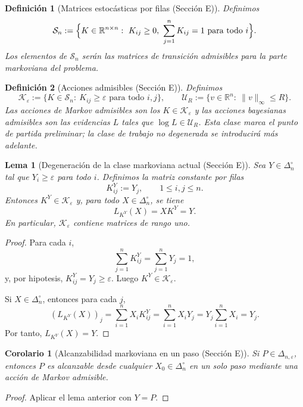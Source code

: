 ﻿\documentclass[12pt]{article}
\newcommand{\fuente}[1]{\textnormal{(#1)}}
\newtheorem{definicion}{Definición}[section]
\newtheorem{lema}{Lema}[section]
\newtheorem{corolario}{Corolario}[section]
\begin{document}
\begin{definicion}[Matrices estocásticas por filas \fuente{Sección E}]
Definimos
\[
\mathcal S_n:=\Bigl\{K\in\mathbb R^{n\times n}:\ K_{ij}\ge 0,\ \sum_{j=1}^n K_{ij}=1\text{ para todo }i\Bigr\}.
\]
Los elementos de \(\mathcal S_n\) serán las matrices de transición admisibles para la parte markoviana del problema.
\end{definicion}

\begin{definicion}[Acciones admisibles \fuente{Sección E}]
Definimos
\[
\mathcal K_\varepsilon:=\bigl\{K\in\mathcal S_n:\ K_{ij}\ge \varepsilon\text{ para todo }i,j\bigr\},
\qquad
\mathcal U_R:=\bigl\{v\in\mathbb R^n:\ \|v\|_\infty\le R\bigr\}.
\]
Las acciones de Markov admisibles son los \(K\in\mathcal K_\varepsilon\) y las acciones bayesianas admisibles son las evidencias \(L\) tales que \(\log L\in\mathcal U_R\). Esta clase marca el punto de partida preliminar; la clase de trabajo no degenerada se introducirá más adelante.
\end{definicion}

\begin{lema}[Degeneración de la clase markoviana actual \fuente{Sección E}]
Sea \(Y\in \Delta_n^\circ\) tal que \(Y_i\ge \varepsilon\) para todo \(i\). Definimos la matriz constante por filas
\[
K^Y_{ij}:=Y_j,\qquad 1\le i,j\le n.
\]
Entonces \(K^Y\in \mathcal K_\varepsilon\) y, para todo \(X\in\Delta_n^\circ\), se tiene
\[
L_{K^Y}(X)=XK^Y=Y.
\]
En particular, \(\mathcal K_\varepsilon\) contiene matrices de rango uno.
\end{lema}
\begin{proof}
Para cada \(i\),
\[
\sum_{j=1}^n K^Y_{ij}=\sum_{j=1}^n Y_j=1,
\]
y, por hipotesis, \(K^Y_{ij}=Y_j\ge \varepsilon\). Luego \(K^Y\in\mathcal K_\varepsilon\).

Si \(X\in\Delta_n^\circ\), entonces para cada \(j\),
\[
(L_{K^Y}(X))_j
=
\sum_{i=1}^n X_iK^Y_{ij}
=
\sum_{i=1}^n X_iY_j
=
Y_j\sum_{i=1}^n X_i
=
Y_j.
\]
Por tanto, \(L_{K^Y}(X)=Y\).
\end{proof}

\begin{corolario}[Alcanzabilidad markoviana en un paso \fuente{Sección E}]
Si \(P\in\Delta_{n,\varepsilon}\), entonces \(P\) es alcanzable desde cualquier \(X_0\in\Delta_n^\circ\) en un solo paso mediante una acción de Markov admisible.
\end{corolario}
\begin{proof}
Aplicar el lema anterior con \(Y=P\).
\end{proof}
\end{document}
